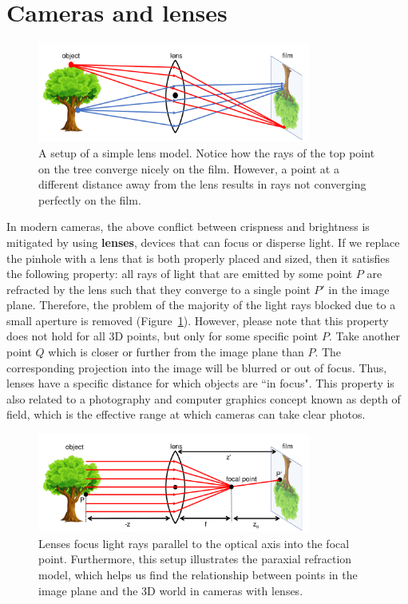 \documentclass[a4paper, 12pt]{article}
\renewcommand\emph{\textbf}
\begin{document}
\section{Cameras and lenses}
\begin{figure}[h!]
\centering
\includegraphics[width=0.8\textwidth]{figures/1-4.pdf}
\caption{A setup of a simple lens model. Notice how the rays of the top point on the tree converge nicely on the film. However, a point at a different distance away from the lens results in rays not converging perfectly on the film.}
\label{fig:lens}
\end{figure}

In modern cameras, the above conflict between crispness and brightness is mitigated by using \emph{lenses}, devices that can focus or disperse light. If we replace the pinhole with a lens that is both properly placed and sized, then it satisfies the following property: all rays of light that are emitted by some point $P$ are refracted by the lens such that they converge to a single point $P'$ in the image plane. Therefore, the problem of the majority of the light rays blocked due to a small aperture is removed (Figure~\ref{fig:lens}). However, please note that this property does not hold for all 3D points, but only for some specific point $P$. Take another point $Q$ which is closer or further from the image plane than $P$. The corresponding projection into the image will be blurred or out of focus. Thus, lenses have a specific distance for which objects are ``in focus". This property is also related to a photography and computer graphics concept known as depth of field, which is the effective range at which cameras can take clear photos.

\begin{figure}[h!]
\centering
\includegraphics[width=0.8\textwidth]{figures/1-5.pdf}
\caption{Lenses focus light rays parallel to the optical axis into the focal point. Furthermore, this setup illustrates the paraxial refraction model, which helps us find the relationship between points in the image plane and the 3D world in cameras with lenses.}
\label{fig:paraxial}
\end{figure}
\end{document}
